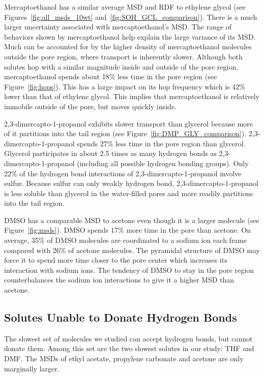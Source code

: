 \documentclass[journal=jpcbfk,manuscript=article]{achemso}
\begin{document}
  Mercaptoethanol has a similar average MSD and RDF to ethylene glycol
  (see Figures~\ref{fig:all_msds_10wt} and~\ref{fig:SOH_GCL_comparison}).
  There is a much larger uncertainty associated with mercaptoethanol's
  MSD. The range of behaviors shown by mercaptoethanol help explain the
  large variance of its MSD. Much can be accounted for by the higher 
  density of mercaptoethanol molecules outside the pore region, where 
  transport is inherently slower. Although both solutes
  hop with a similar magnitude inside and outside of the pore region, mercaptoethanol 
  spends about 18\% less time in the pore region (see Figure~\ref{fig:hops}).
  This has a large impact on its hop frequency which is 42\% lower than that 
  of ethylene glycol. This implies that mercaptoethanol is relatively
  immobile outside of the pore, but moves quickly inside.
  
  2,3-dimercapto-1-propanol exhibits slower transport than glycerol 
  because more of it partitions into the tail region (see 
  Figure~\ref{fig:DMP_GLY_comparison}). 2,3-dimercapto-1-propanol
  spends 27\% less time in the pore region than glycerol. 
  Glycerol participates in about 2.5 times as many hydrogen
  bonds as 2,3-dimercapto-1-propanol (including all possible hydrogen bonding groups). 
  Only 22\% of the hydrogen bond interactions of 2,3-dimercapto-1-propanol
  involve sulfur. Because sulfur can only weakly hydrogen bond, 
  2,3-dimercapto-1-propanol is less soluble than glycerol in the water-filled
  pores and more readily partitions into the tail region.
  
  DMSO has a comparable MSD to acetone even though it is a larger molecule
  (see Figure~\ref{fig:msds}). DMSO spends 17\% more time in the pore than acetone. 
  On average, 35\% of DMSO molecules are coordinated to a sodium ion each
  frame compared with 26\% of acetone molecules. The pyramidal structure 
  of DMSO may force it to spend more time closer to the pore center which
  increases its interaction with sodium ions. The tendency of DMSO to stay
  in the pore region counterbalances the sodium ion interactions to give it
  a higher MSD than acetone. 
  
  \subsection{Solutes Unable to Donate Hydrogen Bonds}  %

  The slowest set of molecules we studied can accept hydrogen bonds, but
  cannot donate them. Among this set are the two slowest solutes in our study: 
  THF and DMF. The MSDs of ethyl acetate, propylene carbonate and acetone are
  only marginally larger.
  
\end{document}
